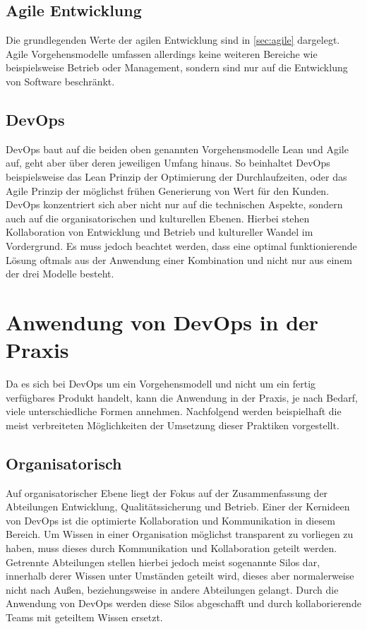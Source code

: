\subsection{Agile Entwicklung}
Die grundlegenden Werte der agilen Entwicklung sind in \autoref{sec:agile} dargelegt.
Agile Vorgehensmodelle umfassen allerdings keine weiteren Bereiche wie beispielsweise Betrieb oder Management, sondern sind nur auf die Entwicklung von Software beschränkt.

\subsection{DevOps}
DevOps baut auf die beiden oben genannten Vorgehensmodelle Lean und Agile auf, geht aber über deren jeweiligen Umfang hinaus. 
So beinhaltet DevOps beispielsweise das Lean Prinzip der Optimierung der Durchlaufzeiten, oder das Agile Prinzip der möglichst frühen Generierung von Wert für den Kunden. 
DevOps konzentriert sich aber nicht nur auf die technischen Aspekte, sondern auch auf die organisatorischen und kulturellen Ebenen. 
Hierbei stehen Kollaboration von Entwicklung und Betrieb und kultureller Wandel im Vordergrund.
Es muss jedoch beachtet werden, dass eine optimal funktionierende Lösung oftmals aus der Anwendung einer Kombination und nicht nur aus einem der drei Modelle besteht.

\section{Anwendung von DevOps in der Praxis} %
Da es sich bei DevOps um ein Vorgehensmodell und nicht um ein fertig verfügbares Produkt handelt, kann die Anwendung in der Praxis, je nach Bedarf, viele unterschiedliche Formen annehmen. Nachfolgend werden beispielhaft die meist verbreiteten Möglichkeiten der Umsetzung dieser Praktiken vorgestellt.

\subsection{Organisatorisch}
Auf organisatorischer Ebene liegt der Fokus auf der Zusammenfassung der Abteilungen Entwicklung, Qualitätssicherung und Betrieb. 
Einer der Kernideen von DevOps ist die optimierte Kollaboration und Kommunikation in diesem Bereich. 
Um Wissen in einer Organisation möglichst transparent zu vorliegen zu haben, muss dieses durch Kommunikation und Kollaboration geteilt werden. 
Getrennte Abteilungen stellen hierbei jedoch meist sogenannte Silos dar, innerhalb derer Wissen unter Umständen geteilt wird, dieses aber normalerweise nicht nach Außen, beziehungsweise in andere Abteilungen gelangt. 
Durch die Anwendung von DevOps werden diese Silos abgeschafft und durch kollaborierende Teams mit geteiltem Wissen ersetzt. 
\parencite[Vgl.][S. 8]{huettermann:2012}


